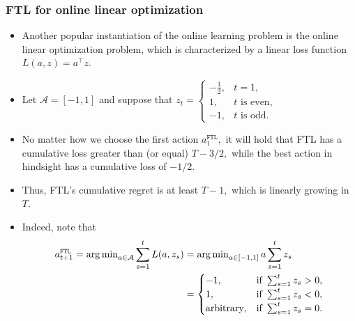 \documentclass[11pt,compress,t,notes=noshow, xcolor=table]{beamer}
\renewcommand{\l}{L}
\newcommand{\Aspace}{\mathcal{A}}
\newcommand{\FTL}{\texttt{FTL}}
\begin{document}
\begin{vbframe} \frametitle{FTL for online linear optimization}
	\small
	\begin{itemize}
		\item Another popular instantiation of the online learning problem is the online linear optimization problem, which is characterized by a linear loss function $\l(a,z)=a^\top z.$ 
		 \item  Let $\Aspace=[-1,1]$ and  suppose that 
		$  z_t = \begin{cases}
			-\frac12, & \mbox{$t=1,$} \\
			1, & \mbox{$t$ is even,}\\
			-1, & \mbox{$t$ is odd.}
		\end{cases} $
		 \item No matter how we choose the first action $a_1^{\FTL},$ it will hold that FTL has a cumulative loss greater than (or equal) $T-3/2,$ while the best action in hindsight has a cumulative loss of $-1/2.$ 
%		 
		\item Thus, FTL's cumulative regret is at least $T-1,$ which is linearly growing in $T.$
%		 
		\scriptsize
		\item Indeed, note that 
%		
		\begin{align*}
%			
			a_{t+1}^{\FTL} = \argmin_{a \in \Aspace} \sum_{s=1}^t \l(a,z_s) &= \argmin_{a \in [-1,1]} a \sum_{s=1}^t  z_s \\
			&= \begin{cases}
				-1, & \mbox{if }\sum_{s=1}^t  z_s>0,\\
				1, & \mbox{if }\sum_{s=1}^t  z_s<0,\\
				\mbox{arbitrary}, & \mbox{if }\sum_{s=1}^t  z_s=0.\\
			\end{cases} 
%			
		\end{align*}
		 

\end{itemize}
\end{vbframe}
\end{document}
